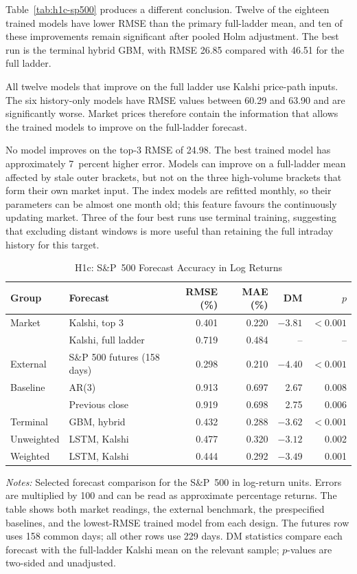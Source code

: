 \documentclass[12pt,a4paper]{report}
\newcommand{\tablenote}[1]{%
  \par\vspace{0.4em}%
  \begin{minipage}{0.9\textwidth}%
  \footnotesize\raggedright\emph{Notes:} #1%
  \end{minipage}%
}
\begin{document}
Table~\ref{tab:h1c-sp500} produces a different conclusion. Twelve of the
eighteen trained models have lower RMSE than the primary full-ladder mean, and
ten of these improvements remain significant after pooled Holm adjustment. The
best run is the terminal hybrid GBM, with RMSE 26.85 compared with 46.51 for
the full ladder.

All twelve models that improve on the full ladder use Kalshi price-path inputs.
The six history-only models have RMSE values between 60.29 and 63.90 and are
significantly worse. Market prices therefore contain the information that
allows the trained models to improve on the full-ladder forecast.

No model improves on the top-3 RMSE of 24.98. The best trained model has
approximately 7~percent higher error. Models can improve on a full-ladder mean
affected by stale outer brackets, but not on the three high-volume brackets
that form their own market input. The index models are refitted monthly, so
their parameters can be almost one month old; this feature favours the
continuously updating market. Three of the four best runs use terminal
training, suggesting that excluding distant windows is more useful than
retaining the full intraday history for this target.

\begin{table}[htbp]
\centering
\caption{H1c: S\&P~500 Forecast Accuracy in Log Returns}
\label{tab:h1c-sp500-returns}
\footnotesize
\begin{tabular}{@{}llrrrr@{}}
\toprule
Group & Forecast & RMSE (\%) & MAE (\%) & DM & $p$ \\
\midrule
Market & Kalshi, top 3 & 0.401 & 0.220 & $-3.81$ & $<0.001$ \\
 & Kalshi, full ladder & 0.719 & 0.484 & -- & -- \\
\midrule
External & S\&P 500 futures (158 days) & 0.298 & 0.210 & $-4.40$ & $<0.001$ \\
\midrule
Baseline & AR(3) & 0.913 & 0.697 & 2.67 & 0.008 \\
 & Previous close & 0.919 & 0.698 & 2.75 & 0.006 \\
\midrule
Terminal & GBM, hybrid & 0.432 & 0.288 & $-3.62$ & $<0.001$ \\
Unweighted & LSTM, Kalshi & 0.477 & 0.320 & $-3.12$ & 0.002 \\
Weighted & LSTM, Kalshi & 0.444 & 0.292 & $-3.49$ & 0.001 \\
\bottomrule
\end{tabular}
\tablenote{Selected forecast comparison for the S\&P~500 in log-return units.
Errors are multiplied by 100 and can be read as approximate
percentage returns. The table shows both market readings, the external
benchmark, the prespecified baselines, and the lowest-RMSE trained model from
each design. The futures row uses 158 common days; all other rows use 229 days.
DM statistics compare each forecast with the full-ladder Kalshi mean on the
relevant sample; $p$-values are two-sided and unadjusted.}
\end{table}
\end{document}
